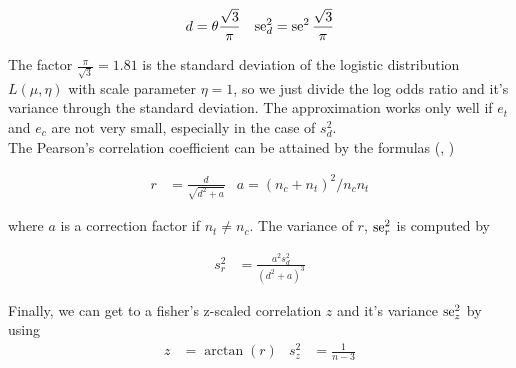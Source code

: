 \documentclass[11pt,a4paper,twoside]{book}\usepackage[]{graphicx}\usepackage[]{color}
\begin{document}
\begin{align}
d &= \theta \frac{\sqrt{3}}{\pi} & \operatorname{se}_d^2 =  \operatorname{se}^2\frac{\sqrt{3}}{\pi} \nonumber
\end{align}

The factor $\frac{\pi}{\sqrt{3}} = 1.81$ is the standard deviation of the logistic distribution $L(\mu, \eta)$ with scale parameter $\eta = 1$, so we just divide the log odds ratio and it's variance through the standard deviation. The approximation works only well if $e_t$ and $e_c$ are not very small, especially in the case of $s_d^2$. \\
The Pearson's correlation coefficient can be attained by the formulas (\citet{olkin1985dtor}, \cite[48]{Intro.meta})

\begin{align}
r &= \frac{d}{\sqrt{d^2 + a}} & a = (n_c + n_t)^2 / n_c n_t \nonumber
\end{align}

where $a$ is a correction factor if $n_t \neq n_c$. The variance of $r$, $\operatorname{se}_r^2$ is computed by

\begin{align}
s_r^2 &= \frac{a^2 s_d^2}{(d^2 + a)^3} \nonumber
\end{align}

Finally, we can get to a fisher's z-scaled correlation $z$ and it's variance $\operatorname{se}_z^2$ by using
\begin{align}
z &= \arctan(r) & \nonumber
s_z^2 &= \frac{1}{n-3}
\end{align}















\end{document}

